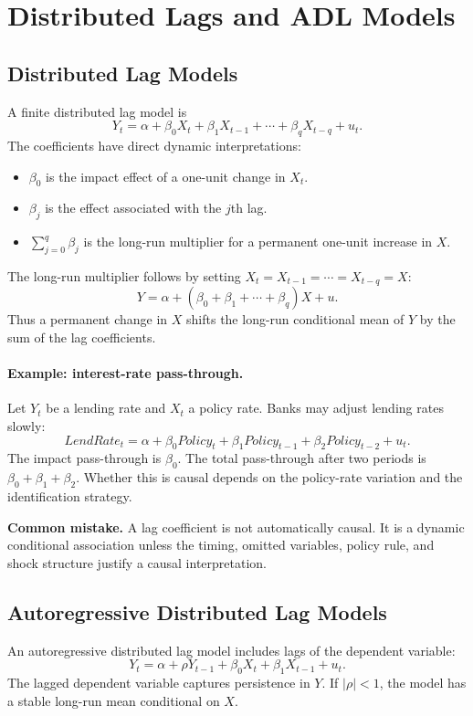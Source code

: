 \section{Distributed Lags and ADL Models}

\subsection{Distributed Lag Models}
A finite distributed lag model is
\begin{equation}
Y_t=\alpha+\beta_0X_t+\beta_1X_{t-1}+\cdots+\beta_qX_{t-q}+u_t.
\label{eq:dl}
\end{equation}
The coefficients have direct dynamic interpretations:
\begin{itemize}
\item $\beta_0$ is the impact effect of a one-unit change in $X_t$.
\item $\beta_j$ is the effect associated with the $j$th lag.
\item $\sum_{j=0}^{q}\beta_j$ is the long-run multiplier for a permanent one-unit increase in $X$.
\end{itemize}

The long-run multiplier follows by setting $X_t=X_{t-1}=\cdots=X_{t-q}=X$:
\[
Y=\alpha+(\beta_0+\beta_1+\cdots+\beta_q)X+u.
\]
Thus a permanent change in $X$ shifts the long-run conditional mean of $Y$ by the sum of the lag coefficients.

\paragraph{Example: interest-rate pass-through.}
Let $Y_t$ be a lending rate and $X_t$ a policy rate. Banks may adjust lending rates slowly:
\[
LendRate_t=\alpha+\beta_0Policy_t+\beta_1Policy_{t-1}+\beta_2Policy_{t-2}+u_t.
\]
The impact pass-through is $\beta_0$. The total pass-through after two periods is $\beta_0+\beta_1+\beta_2$. Whether this is causal depends on the policy-rate variation and the identification strategy.

\begin{boxF}
\textbf{Common mistake.}
A lag coefficient is not automatically causal. It is a dynamic conditional association unless the timing, omitted variables, policy rule, and shock structure justify a causal interpretation.
\end{boxF}

\subsection{Autoregressive Distributed Lag Models}
An autoregressive distributed lag model includes lags of the dependent variable:
\begin{equation}
Y_t=\alpha+\rho Y_{t-1}+\beta_0X_t+\beta_1X_{t-1}+u_t.
\label{eq:adl11}
\end{equation}
The lagged dependent variable captures persistence in $Y$. If $|\rho|<1$, the model has a stable long-run mean conditional on $X$.

